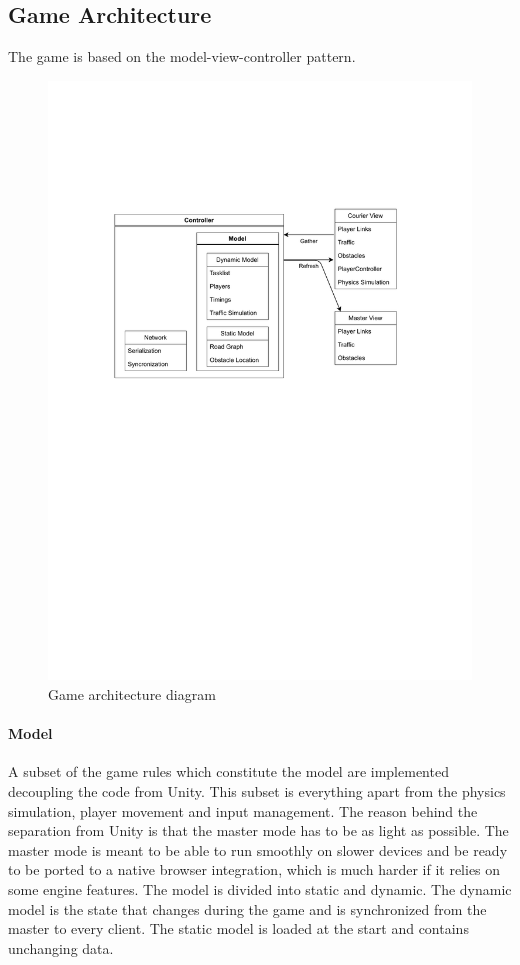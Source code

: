 \documentclass[12pt]{article}
\begin{document}
\subsection{Game Architecture}
The game is based on the model-view-controller pattern. \cite{mvc}
\begin{figure}[H]
\includegraphics[width=\textwidth]{game architecture}
\caption{Game architecture diagram}
\label{fig:gamearch}
\end{figure}
\paragraph{Model}
A subset of the game rules which constitute the model are implemented decoupling the code from Unity. This subset is everything apart from the physics simulation, player movement and input management. The reason behind the separation from Unity is that the master mode has to be as light as possible. The master mode is meant to be able to run smoothly on slower devices and be ready to be ported to a native browser integration, which is much harder if it relies on some engine features. The model is divided into static and dynamic. The dynamic model is the state that changes during the game and is synchronized from the master to every client. The static model is loaded at the start and contains unchanging data.
\end{document}
